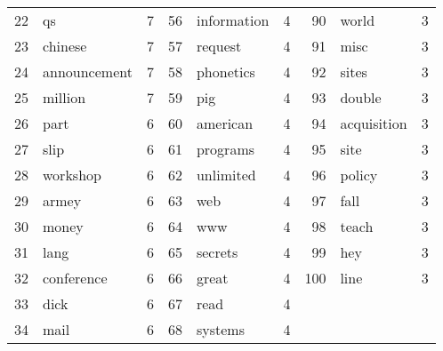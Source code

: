 \documentclass[10pt, a4paper]{article}
\begin{document}
\begin{table}[H]
\begin{tabular}{@{}rlrrlrrlr@{}}
22 & qs & 7 & 56 & information & 4 & 90 & world & 3 \\
23 & chinese & 7 & 57 & request & 4 & 91 & misc & 3 \\
24 & announcement & 7 & 58 & phonetics & 4 & 92 & sites & 3 \\
25 & million & 7 & 59 & pig & 4 & 93 & double & 3 \\
26 & part & 6 & 60 & american & 4 & 94 & acquisition & 3 \\
27 & slip & 6 & 61 & programs & 4 & 95 & site & 3 \\
28 & workshop & 6 & 62 & unlimited & 4 & 96 & policy & 3 \\
29 & armey & 6 & 63 & web & 4 & 97 & fall & 3 \\
30 & money & 6 & 64 & www & 4 & 98 & teach & 3 \\
31 & lang & 6 & 65 & secrets & 4 & 99 & hey & 3 \\
32 & conference & 6 & 66 & great & 4 & 100 & line & 3 \\
33 & dick & 6 & 67 & read & 4 &  &  &  \\
34 & mail & 6 & 68 & systems & 4 &  &  &  \\
\bottomrule
\end{tabular}
\label{table:subjcorpus}
\end{table}
\end{document}

